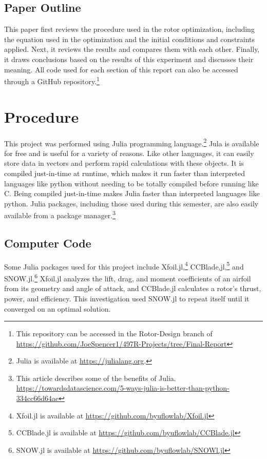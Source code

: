 \documentclass[journal ]{new-aiaa}
\begin{document}
\subsection{Paper Outline} 

This paper first reviews the procedure used in the rotor optimization, including the equation used in the optimization and the initial conditions and constraints applied. Next, it reviews the results and compares them with each other. Finally, it draws conclusions based on the results of this experiment and discusses their meaning. All code used for each section of this report can also be accessed through a GitHub repository.\footnote{This repository can be accessed in the Rotor-Design branch of \url{https://github.com/JoeSpencer1/497R-Projects/tree/Final-Report}}


\section{Procedure}

This project was performed using Julia programming language.\footnote{Julia is available at \url{https://julialang.org}.} Jula is available for free and is useful for a variety of reasons. Like other languages, it can easily store data in vectors and perform rapid calculations with these objects. It is compiled just-in-time at runtime, which makes it run faster than interpreted languages like python without needing to be totally compiled before running like C. Being compiled just-in-time makes Julia faster than interpreted languages like python. Julia  packages, including those used during this semester, are also easily available from a package manager.\footnote{This article describes some of the benefits of Julia. \url{https://towardsdatascience.com/5-ways-julia-is-better-than-python-334cc66d64ae}}

\subsection{Computer Code}

Some Julia packages used for this project include Xfoil.jl,\footnote{Xfoil.jl is available at \url{https://github.com/byuflowlab/Xfoil.jl}} CCBlade,jl,\footnote{CCBlade.jl is available at \url{https://github.com/byuflowlab/CCBlade.jl}} and SNOW.jl.\footnote{SNOW.jl is available at \url{https://github.com/byuflowlab/SNOWl.jl}} Xfoil.jl analyzes the lift, drag, and moment coefficients of an airfoil from its geometry and angle of attack, and CCBlade.jl calculates a rotor's thrust, power, and efficiency\cite{CCBlade}. This investigation used SNOW.jl to repeat itself until it converged on an optimal solution.
\end{document}
